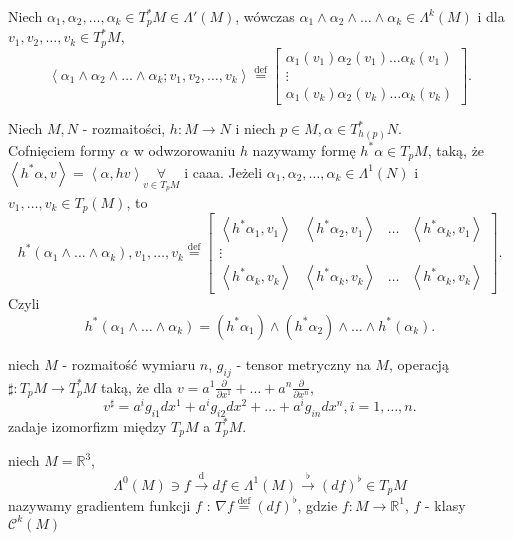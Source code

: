 \documentclass{article}
\begin{document}
\begin{definicja}
Niech $\alpha_1,\alpha_2,\ldots,\alpha_k\in T_p^*M\in\Lambda'(M)$, wówczas $\alpha_1\land\alpha_2\land\ldots\land\alpha_k\in \Lambda^k(M)$ i dla $v_1,v_2,\ldots,v_k\in T_p^*M$,
\[
\left<\alpha_1\land\alpha_2\land\ldots\land\alpha_k; v_1,v_2,\ldots,v_k \right> \overset{\text{def}}{=}  \begin{bmatrix} \alpha_1(v_1)\alpha_2(v_1)\ldots\alpha_k(v_1)\\ \vdots \\ \alpha_1(v_k)\alpha_2(v_k)\ldots\alpha_k(v_k) \end{bmatrix}
.\]
\end{definicja}
\begin{definicja}
Niech $M, N$ - rozmaitości, $h: M\to N$ i niech $p\in M, \alpha\in T^*_{h(p)}N$.\\
Cofnięciem formy $\alpha$ w odwzorowaniu $h$ nazywamy formę $h^*\alpha \in T_pM$, taką, że $\left<h^*\alpha,v \right> = \left<\alpha,hv \right>\underset{v\in T_pM}{\forall} $ i caaa. Jeżeli $\alpha_1,\alpha_2,\ldots,\alpha_k \in \Lambda^1(N)$ i $v_1,\ldots,v_k\in T_p(M)$, to
\[
h^*(\alpha_1\land\ldots\land\alpha_k), v_1,\ldots,v_k \overset{\text{def}}{=} \begin{bmatrix} \left<h^*\alpha_1,v_1 \right>&\left<h^*\alpha_2,v_1 \right>&\ldots&\left<h^*\alpha_k,v_1 \right> \\
\vdots &&&\\
\left<h^*\alpha_k,v_k \right>&\left<h^*\alpha_k, v_k \right>&\ldots&\left<h^*\alpha_k,v_k \right>
\end{bmatrix}
.\]
Czyli
\[
h^*(\alpha_1\land\ldots\land\alpha_k) = (h^*\alpha_1)\land(h^*\alpha_2)\land\ldots\land h^*(\alpha_k)
.\]
\end{definicja}
\begin{definicja}
niech $M$ - rozmaitość wymiaru $n$, $g_{ij}$ - tensor metryczny na $M$, operacją $\sharp: T_pM \to T_p^*M$ taką, że dla $v = a^1 \frac{\partial }{\partial x^1} + \ldots + a^n \frac{\partial }{\partial x^n} $,\\
\[
v^{\sharp}=a^ig_{i1}dx^1 + a^ig_{i2}dx^2 + \ldots + a^ig_{in}dx^n, i=1,\ldots,n
.\]
zadaje izomorfizm między $T_pM$ a $T_p^*M$.
\end{definicja}
\begin{definicja}
niech $M = \mathbb{R}^3$,
\[
\Lambda^0(M)\ni f \overset{\text{d}}{\to} df\in \Lambda^1(M) \overset{\flat}{\to} \left( df \right) ^\flat \in T_pM
\]
nazywamy gradientem funkcji $f$ : $\nabla f \overset{\text{def}}{=} \left( df \right) ^\flat$, gdzie $f: M\to \mathbb{R}^1$, $f$ - klasy $\mathcal{C}^k(M)$
\end{definicja}
\end{document}
